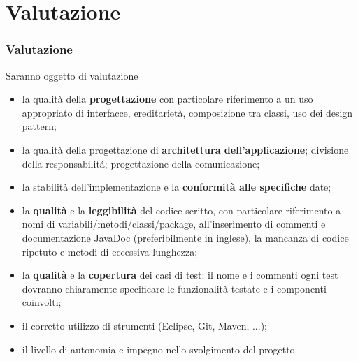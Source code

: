 \documentclass{beamer}
\begin{document}
\section{Valutazione}
\begin{frame}
\frametitle{Valutazione}

Saranno oggetto di valutazione
\begin{itemize}
\item la qualit\` a della \textbf{progettazione} con particolare riferimento a
  un uso appropriato di interfacce, ereditariet\`a, composizione tra
  classi, uso dei design pattern;
\item la qualit\` a della progettazione di \textbf{architettura
  dell'applicazione}; divisione della responsabilit\'a; progettazione
  della comunicazione;
\item la stabilit\` a dell'implementazione e la \textbf{conformit\` a alle
  specifiche} date; 
\item la \textbf{qualit\` a} e la \textbf{leggibilit\` a} del codice scritto, con
  particolare riferimento a nomi di variabili/metodi/classi/package,
  all'inserimento di commenti e documentazione JavaDoc
  (preferibilmente in inglese), la mancanza di codice ripetuto e
  metodi di eccessiva lunghezza;
\item la \textbf{qualit\` a} e la \textbf{copertura} dei casi di test: il nome e i
  commenti ogni test dovranno chiaramente specificare le funzionalit\`
  a testate e i componenti coinvolti;
 \item il corretto utilizzo di strumenti (Eclipse, Git, Maven, ...);
\item il livello di autonomia e impegno nello svolgimento del progetto.
\end{itemize}
\end{frame}
\end{document}
